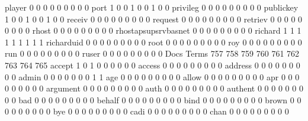 \documentclass[compress,8pt]{beamer}
\begin{document}
\begin{frame}
\begin{Schunk}
  player                                     0   0   0   0   0   0   0   0   0
  port                                       1   0   0   1   0   0   1   0   0
  privileg                                   0   0   0   0   0   0   0   0   0
  publickey                                  1   0   0   1   0   0   1   0   0
  receiv                                     0   0   0   0   0   0   0   0   0
  request                                    0   0   0   0   0   0   0   0   0
  retriev                                    0   0   0   0   0   0   0   0   0
  rhost                                      0   0   0   0   0   0   0   0   0
  rhostapsupsrvbasnet                        0   0   0   0   0   0   0   0   0
  richard                                    1   1   1   1   1   1   1   1   1
  richarduid                                 0   0   0   0   0   0   0   0   0
  root                                       0   0   0   0   0   0   0   0   0
  roy                                        0   0   0   0   0   0   0   0   0
  run                                        0   0   0   0   0   0   0   0   0
  ruser                                      0   0   0   0   0   0   0   0   0
                                          Docs
Terms                                      757 758 759 760 761 762 763 764 765
  accept                                     1   0   1   0   0   0   0   0   0
  access                                     0   0   0   0   0   0   0   0   0
  address                                    0   0   0   0   0   0   0   0   0
  admin                                      0   0   0   0   0   0   0   1   1
  age                                        0   0   0   0   0   0   0   0   0
  allow                                      0   0   0   0   0   0   0   0   0
  apr                                        0   0   0   0   0   0   0   0   0
  argument                                   0   0   0   0   0   0   0   0   0
  auth                                       0   0   0   0   0   0   0   0   0
  authent                                    0   0   0   0   0   0   0   0   0
  bad                                        0   0   0   0   0   0   0   0   0
  behalf                                     0   0   0   0   0   0   0   0   0
  bind                                       0   0   0   0   0   0   0   0   0
  brown                                      0   0   0   0   0   0   0   0   0
  bye                                        0   0   0   0   0   0   0   0   0
  cadi                                       0   0   0   0   0   0   0   0   0
  chan                                       0   0   0   0   0   0   0   0   0

\end{Schunk}
\end{frame}
\end{document}
